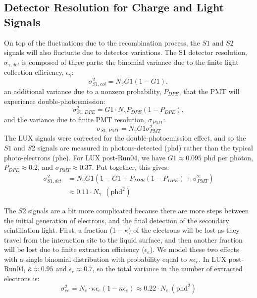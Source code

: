 \clearpage

\subsection{Detector Resolution for Charge and Light Signals}\label{sec:detres}
On top of the fluctuations due to the recombination process, the $S1$ and $S2$ signals will also fluctuate due to detector variations. The S1 detector resolution, $\sigma_{\gamma,det}$ is composed of three parts: the binomial variance due to the finite light collection efficiency, $\epsilon_{\gamma}$:
\begin{equation}
\sigma_{S1,col}^2=N_{\gamma}G1(1-G1), 
\end{equation}
an additional variance due to a nonzero probability, $P_{DPE}$, that the PMT will experience double-photoemission\cite{DPE}:
\begin{equation}
\sigma_{S1,DPE}^2=G1\cdot N_{\gamma}P_{DPE}(1-P_{DPE}), 
\end{equation}
and the variance due to finite PMT resolution, $\sigma_{PMT}$:
\begin{equation}
\sigma_{S1,PMT}=N_{\gamma}G1\sigma_{PMT}^2
\end{equation}
The LUX signals were corrected for the double-photoemission effect, and so the $S1$ and $S2$ signals are measured in photons-detected (phd) rather than the typical photo-electrons (phe). For LUX post-Run04, we have $G1\approx 0.095$ phd per photon, $P_{DPE}\approx 0.2$, and $\sigma_{PMT}\approx 0.37$. Put together, this gives:
\begin{equation}
\begin{split}
\sigma_{S1,det}^2&=N_{\gamma}G1(1-G1+P_{DPE}(1-P_{DPE})+\sigma_{PMT}^2)\\
&\approx 0.11 \cdot N_{\gamma} \ \ (\text{phd}^2)
\end{split}
\end{equation}

The $S2$ signals are a bit more complicated because there are more steps between the initial generation of electrons, and the final detection of the secondary scintillation light. First, a fraction ($1-\kappa$) of the electrons will be lost as they travel from the interaction site to the liquid surface, and then another fraction will be lost due to finite extraction efficiency ($\epsilon_e$). We model these two effects with a single binomial distribution with probability equal to $\kappa\epsilon_e$. In LUX post-Run04, $\overline{\kappa} \approx 0.95$ and $\epsilon_e \approx 0.7$, so the total variance in the number of extracted electrons is:
\begin{equation}
\sigma_{ee}^2=N_e\cdot \kappa\epsilon_e(1-\kappa\epsilon_e)\approx 0.22 \cdot N_e \ (\text{phd}^2)
\end{equation}

